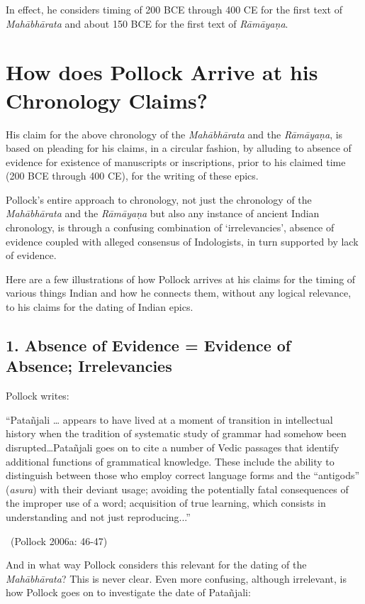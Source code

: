 In effect, he considers timing of 200 BCE through 400 CE for the first text of \textit{Mahābhārata} and about 150 BCE for the first text of \textit{Rāmāyaṇa}.


\section*{How does Pollock Arrive at his Chronology Claims?}

His claim for the above chronology of the \textit{Mahābhārata} and the \textit{Rāmāyaṇa}, is based on pleading for his claims, in a circular fashion, by alluding to absence of evidence for existence of manuscripts or inscriptions, prior to his claimed time (200 BCE through 400 CE), for the writing of these epics.

Pollock’s entire approach to chronology, not just the chronology of the \textit{Mahābhārata} and the \textit{Rāmāyaṇa} but also any instance of ancient Indian chronology, is through a confusing combination of ‘irrelevancies’, absence of evidence coupled with alleged consensus of Indologists, in turn supported by lack of evidence.

Here are a few illustrations of how Pollock arrives at his claims for the timing of various things Indian and how he connects them, without any logical relevance, to his claims for the dating of Indian epics.

\subsection*{1. Absence of Evidence = Evidence of Absence; Irrelevancies}

Pollock writes:

\begin{myquote}
“Patañjali … appears to have lived at a moment of transition in intellectual history when the tradition of systematic study of grammar had somehow been disrupted…Patañjali goes on to cite a number of Vedic passages that identify additional functions of grammatical knowledge. These include the ability to distinguish between those who employ correct language forms and the “antigods” (\textit{asura}) with their deviant usage; avoiding the potentially fatal consequences of the improper use of a word; acquisition of true learning, which consists in understanding and not just reproducing...” 

~\hfill (Pollock 2006a: 46-47)
\end{myquote}

And in what way Pollock considers this relevant for the dating of the \textit{Mahābhārata}? This is never clear. Even more confusing, although irrelevant, is how Pollock goes on to investigate the date of Patañjali:

